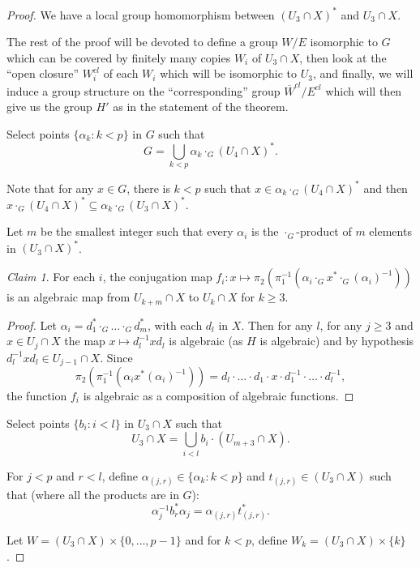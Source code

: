 \documentclass[12pt]{article}
\theoremstyle{definition}
\theoremstyle{mystyle}
\theoremstyle{remark}
\newtheorem*{claim}{Claim}
\newenvironment{claimproof}
    {\begin{proof}}{\renewcommand\qedsymbol{\Squarepipe} \end{proof}}
\begin{document}
\begin{proof}
We have a local group homomorphism between $(U_3\cap X)^*$ and
$U_3\cap X$.

The rest of the proof will be devoted to define a group $W/E$
isomorphic to $G$ which can be covered by finitely many copies
$W_i$ of $U_3\cap X$, then look at the ``open closure'' $W_i^{cl}$
of each $W_i$ which will be isomorphic to $U_3$, and finally, we
will induce a group structure on the ``corresponding'' group
$\overline W^{cl}/E^{cl}$ which will then give us the group $H'$
as in the statement of the theorem.


Select points $\{\alpha_k :k<p\}$ in $G$ such that \[G =
\displaystyle{\bigcup_{k<p} \alpha_k \cdot_G (U_4\cap X)^*}.\]%

Note that for any $x\in G$, there is $k<p$ such that $x\in \alpha_k \cdot_G (U_4\cap X)^*$ and then $x\cdot_G (U_4\cap X)^{*}\subseteq \alpha_k \cdot_G (U_3 \cap X)^{*}$.

Let $m$ be the smallest integer such that every $\alpha_i$ is the
$\cdot_G$-product of $m$ elements in $(U_3\cap X)^*$.
\bigskip

\begin{claim} For each $i$, the conjugation map $f_{i}: x\mapsto
\pi_2(\pi_1^{-1}(\alpha_i\cdot_G x^*\cdot_G (\alpha_i)^{-1}))$ is
an algebraic map from $U_{k+m}\cap X$ to $U_{k}\cap X$ for
$k\geq 3$.
\end{claim}

\begin{claimproof} Let $\alpha_i=d_1^*\cdot_G \dots \cdot_G d_m^*$, with each $d_l$ in $X$. Then for any $l$,
for any $j\geq 3$ and $x\in U_j\cap X$ the map $x\mapsto d_l^{-1} x d_l$
is algebraic (as $H$ is algebraic) and by
hypothesis $d_l^{-1} x d_l\in U_{j-1}\cap X$. Since
\[
\pi_2(\pi_1^{-1}(\alpha_i x^* (\alpha_i)^{-1}))=d_l\cdot \dots
\cdot d_1\cdot x \cdot d_1^{-1} \cdot \dots \cdot d_l^{-1},
\]
the function $f_i$ is algebraic as a composition of algebraic functions.
\end{claimproof}


Select points $\{b_i :i<l\}$ in $U_3\cap X$ such that \[U_3\cap X
=\displaystyle{\bigcup_{i<l} b_i \cdot (U_{m+3}\cap X)}.\]

For $j<p$ and $r<l$, define $\alpha_{(j,r)}\in \{\alpha_k:k<p\}$ and $t_{(j,r)}\in (U_3 \cap X)$ such that (where all the products are in $G$):
\[
\alpha_j^{-1} b_r^{*}  \alpha_j = \alpha_{(j,r)} t^{*}_{(j,r)}.
\]


Let $W=(U_3 \cap X) \times \{0,\ldots, p-1\}$ and for $k<p$,
define $W_k = (U_3\cap X) \times \{k\}$.


\end{proof}
\end{document}
